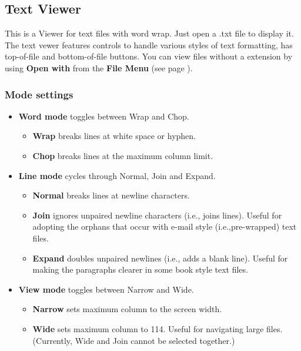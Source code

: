\subsection{Text Viewer}
This is a Viewer for text files with word wrap. Just open a .txt file to
display it. The text vewer features controls to handle various styles of text
formatting, has top{}-of{}-file and bottom{}-of{}-file buttons. You can view
files without a  extension by using \textbf{Open with} from the
\textbf{File Menu} (see page \pageref{ref:Filemenu}).

\subsubsection{Mode settings}

\begin{itemize}
\item\textbf{Word mode} toggles between Wrap and Chop.
    \begin{itemize}
        \item\textbf{Wrap} breaks lines at white space or hyphen.
        \item\textbf{Chop} breaks lines at the maximum column limit.
    \end{itemize}  
\item\textbf{Line mode} cycles through Normal, Join and Expand.
    \begin{itemize}
        \item\textbf{Normal} breaks lines at newline characters.
        \item\textbf{Join} ignores unpaired newline characters  (i.e., joins lines). Useful for adopting the orphans that occur with e{}-mail style (i.e.,pre{}-wrapped) text files.
        \item\textbf{Expand} doubles unpaired newlines (i.e., adds a blank line). Useful for making the paragraphs clearer in some book style text files.
    \end{itemize}
\item\textbf{View mode} toggles between Narrow and Wide.
    \begin{itemize}
        \item\textbf{Narrow} sets maximum column to the screen width.
        \item\textbf{Wide} sets maximum column to 114. Useful for navigating large files. (Currently, Wide and Join cannot be selected together.)
    \end{itemize}
\end{itemize}
